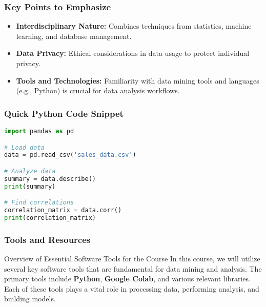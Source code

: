 \documentclass[aspectratio=169]{beamer}
\begin{document}
\begin{frame}[fragile]
    \frametitle{Key Points to Emphasize}
    \begin{itemize}
        \item \textbf{Interdisciplinary Nature:} Combines techniques from statistics, machine learning, and database management.
        
        \item \textbf{Data Privacy:} Ethical considerations in data usage to protect individual privacy.
        
        \item \textbf{Tools and Technologies:} Familiarity with data mining tools and languages (e.g., Python) is crucial for data analysis workflows.
    \end{itemize}
\end{frame}

\begin{frame}[fragile]
    \frametitle{Quick Python Code Snippet}
    \begin{lstlisting}[language=Python]
import pandas as pd

# Load data
data = pd.read_csv('sales_data.csv')

# Analyze data
summary = data.describe()
print(summary)

# Find correlations
correlation_matrix = data.corr()
print(correlation_matrix)
    \end{lstlisting}
\end{frame}

\begin{frame}
  \frametitle{Tools and Resources}
  \begin{block}{Overview of Essential Software Tools for the Course}
    In this course, we will utilize several key software tools that are fundamental for data mining and analysis. The primary tools include \textbf{Python}, \textbf{Google Colab}, and various relevant libraries. Each of these tools plays a vital role in processing data, performing analysis, and building models.
  \end{block}
\end{frame}
\end{document}
